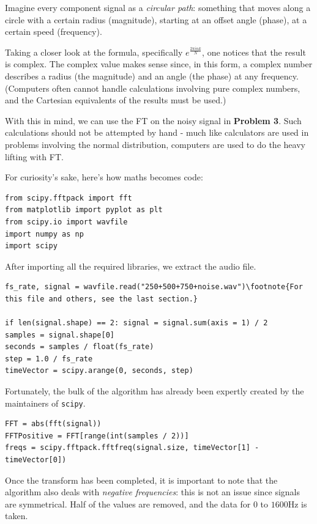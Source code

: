 \documentclass{article}
\begin{document}
Imagine every component signal as a \emph{circular path}: something that moves along a circle with a certain radius (magnitude), starting at an offset angle (phase), at a certain speed (frequency). 

Taking a closer look at the formula, specifically $e^{\frac{2\pi ink}{N}}$, one notices that the result is complex. The complex value makes sense since, in this form, a complex number describes  a radius (the magnitude) and an angle (the phase) at  any frequency. (Computers often cannot handle calculations involving pure complex numbers, and the Cartesian equivalents of the results must be used.)

With this in mind, we can use the FT on the noisy signal in \textbf{Problem 3}. Such calculations should not be attempted by hand - much like calculators are used in problems involving the normal distribution, computers are used to do the heavy lifting with FT. 

For curiosity's sake, here's how maths becomes code:

\begin{verbatim}
from scipy.fftpack import fft
from matplotlib import pyplot as plt
from scipy.io import wavfile
import numpy as np
import scipy
\end{verbatim}

After importing all the required libraries, we extract the audio file.

\begin{verbatim}
fs_rate, signal = wavfile.read("250+500+750+noise.wav")\footnote{For this file and others, see the last section.}

if len(signal.shape) == 2: signal = signal.sum(axis = 1) / 2
samples = signal.shape[0]
seconds = samples / float(fs_rate)
step = 1.0 / fs_rate
timeVector = scipy.arange(0, seconds, step)
\end{verbatim}

Fortunately, the bulk of the algorithm has already been expertly created by the maintainers of \texttt{scipy}.

\begin{verbatim}
FFT = abs(fft(signal))
FFTPositive = FFT[range(int(samples / 2))]
freqs = scipy.fftpack.fftfreq(signal.size, timeVector[1] - timeVector[0])
\end{verbatim}

Once the transform has been completed, it is important to note that the algorithm also deals with \emph{negative frequencies}: this is not an issue since signals are symmetrical. Half of the values are removed, and the data for $0$ to $1600$Hz is taken.
\end{document}
